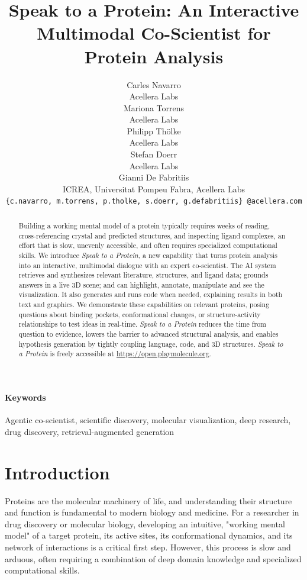 \documentclass{article}
\title{Speak to a Protein: An Interactive Multimodal Co-Scientist for Protein Analysis} %
\author{
Carles Navarro\\
Acellera Labs\\
\And
Mariona Torrens\\
Acellera Labs\\
\And 
Philipp Thölke\\
Acellera Labs\\
\And
Stefan Doerr \\
Acellera Labs\\
\And
Gianni De Fabritiis \\
ICREA, Universitat Pompeu Fabra, Acellera Labs\\
\texttt{\{c.navarro, m.torrens, p.tholke, s.doerr, g.defabritiis\} @acellera.com} \\}
\begin{document}
\maketitle

\begin{abstract}
Building a working mental model of a protein typically requires weeks of reading, cross-referencing crystal and predicted structures, and inspecting ligand complexes, an effort that is slow, unevenly accessible, and often requires specialized computational skills. We introduce \emph{Speak to a Protein}, a new capability that turns protein analysis into an interactive, multimodal dialogue with an expert co-scientist. The AI system retrieves and synthesizes relevant literature, structures, and ligand data; grounds answers in a live 3D scene; and can highlight, annotate, manipulate and see the visualization. It also generates and runs code when needed, explaining results in both text and graphics.
We demonstrate these capabilities on relevant proteins, posing questions about binding pockets, conformational changes, or structure-activity relationships to test ideas in real-time. \emph{Speak to a Protein} reduces the time from question to evidence, lowers the barrier to advanced structural analysis, and enables hypothesis generation by tightly coupling language, code, and 3D structures. \emph{Speak to a Protein} is freely accessible at \url{https://open.playmolecule.org}.
\end{abstract}

\paragraph{Keywords} Agentic co-scientist, scientific discovery, molecular visualization, deep research, drug discovery, retrieval-augmented generation

\section{Introduction}\label{sec:intro}
Proteins are the molecular machinery of life, and understanding their structure and function is fundamental to modern biology and medicine. For a researcher in drug discovery or molecular biology, developing an intuitive, "working mental model" of a target protein, its active sites, its conformational dynamics, and its network of interactions is a critical first step. However, this process is slow and arduous, often requiring a combination of deep domain knowledge and specialized computational skills.
\end{document}
